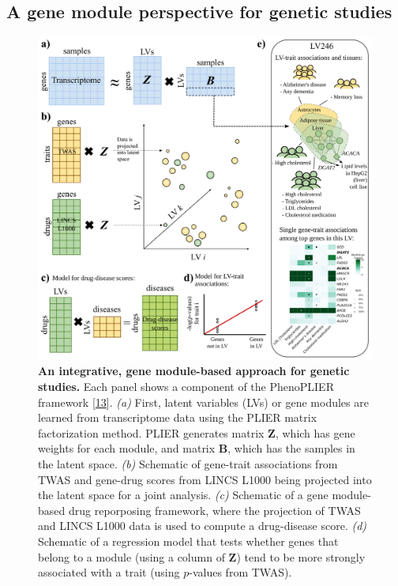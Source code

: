 \hypertarget{a-gene-module-perspective-for-genetic-studies}{%
\subsection{A gene module perspective for genetic studies}\label{a-gene-module-perspective-for-genetic-studies}}

\begin{figure}
\hypertarget{fig:fig4}{%
\centering
\includegraphics[width=1\textwidth,height=\textheight]{images/fig4.svg}
\caption{\textbf{An integrative, gene module-based approach for genetic studies.}
Each panel shows a component of the PhenoPLIER framework {[}\protect\hyperlink{ref-NM3rHx1i}{13}{]}.
\emph{(a)} First, latent variables (LVs) or gene modules are learned from transcriptome data using the PLIER matrix factorization method.
PLIER generates matrix \(\mathbf{Z}\), which has gene weights for each module, and matrix \(\mathbf{B}\), which has the samples in the latent space.
\emph{(b)} Schematic of gene-trait associations from TWAS and gene-drug scores from LINCS L1000 being projected into the latent space for a joint analysis.
\emph{(c)} Schematic of a gene module-based drug reporposing framework, where the projection of TWAS and LINCS L1000 data is used to compute a drug-disease score.
\emph{(d)} Schematic of a regression model that tests whether genes that belong to a module (using a column of \(\mathbf{Z}\)) tend to be more strongly associated with a trait (using \(p\)-values from TWAS).
}}
\end{figure}
